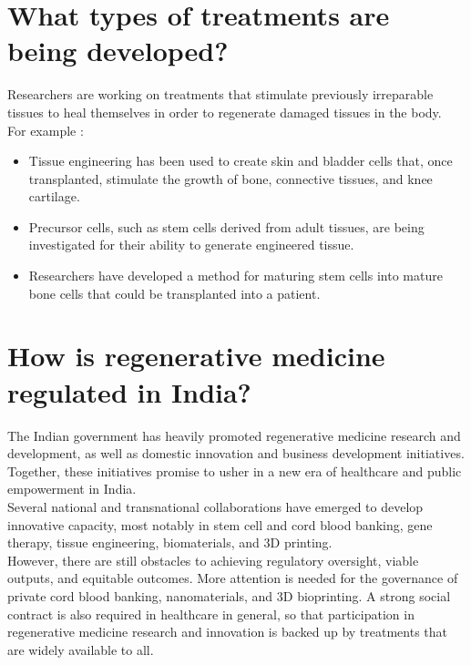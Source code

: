 \documentclass[12pt]{article}
\begin{document}
\section*{\LARGE  What types of treatments are being developed? }
\Large
\raggedright
Researchers are working on treatments that stimulate previously irreparable tissues to heal themselves in order to regenerate damaged tissues in the body.\\
\vspace{3mm}
For example :
\begin{itemize}
\item Tissue engineering has been used to create skin and bladder cells that, once transplanted, stimulate the 
growth of bone, connective tissues, and knee cartilage.
\item Precursor cells, such as stem cells derived from adult tissues, are being investigated for their ability to generate engineered tissue.
\item Researchers have developed a method for maturing stem cells into mature bone cells that could be transplanted into a patient.
\end{itemize}

\section*{\LARGE How is regenerative medicine regulated in India? }
The Indian government has heavily promoted regenerative medicine research and development, as well as domestic innovation and business development initiatives. Together, these initiatives promise to usher in a new era of healthcare and public empowerment in India. \\
\vspace{3mm}
Several national and transnational collaborations have emerged to develop innovative capacity, most notably in stem cell and cord blood banking, gene therapy, tissue engineering, biomaterials, and 3D printing.\\
\vspace{3mm}
 However, there are still obstacles to achieving regulatory oversight, viable outputs, and equitable outcomes. More attention is needed for the governance of private cord blood banking, nanomaterials, and 3D bioprinting. A strong social contract is also required in healthcare in general, so that participation in regenerative medicine research and innovation is backed up by treatments that are widely available to all.
\end{document}
